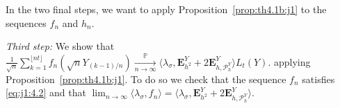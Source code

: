 \documentclass[12pt]{article}
\numberwithin{equation}{section}
\theoremstyle{definition}
\theoremstyle{remark}
\newcommand{\convp}[1][]{\xrightarrow[#1]{\PP}}
\newcommand{\RR}{\mathbb{R}}
\newcommand{\PP}{\mathbb{P}}
\newcommand{\EE}{\mathbb{E}}
\newcommand{\vd}{\,\mathrm{d}}
\newcommand{\bfH}[1]{\mathbf{E}^Y_{#1}}
\newcommand{\Lm}[3]{\mathbb{L}^{(#2)}(#1,#3)}
\begin{document}

In the two final steps, we want to apply Proposition~\ref{prop:th4.1b:j1} to the sequences $f_n$ and $h_n$.

{\em Third step:\/} We show that
$
	\frac1{\sqrt n}  \sum_{k=1}^{\lfloor n t \rfloor} f_n (\sqrt{n} Y_{(k-1)/n}) \convp[n\to\infty]
	\langle \lambda_\sigma , \bfH {h^2} + 2 \bfH{h, \mathcal{P}_{h}^{Y} } \rangle L_t(Y).
$
applying Proposition~\ref{prop:th4.1b:j1}.
To do so we check that the sequence $f_n$ satisfies \eqref{eq:j1:4.2} and that 
$
	\lim_{n\to\infty}\langle \lambda_\sigma , f_n \rangle=\langle \lambda_\sigma , \bfH {h^2} + 2 \bfH{h, \mathcal{P}_{h}^{Y} } \rangle
$.
\end{document}
